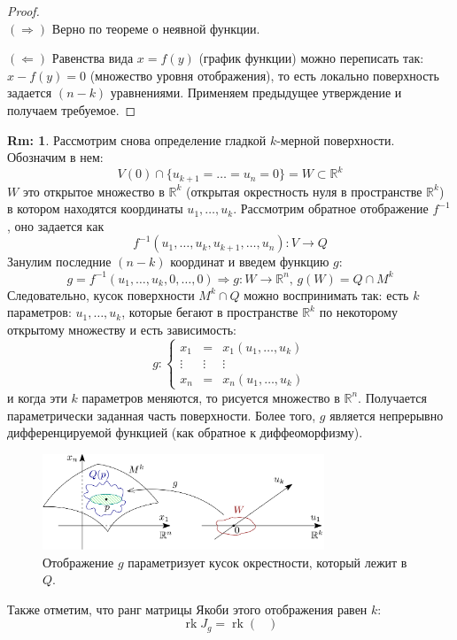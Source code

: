 \documentclass[12pt]{article}
\newcommand{\MR}{\mathbb{R}}
\theoremstyle{definition}
\newtheorem{rem}{Rm:}
\DeclareMathOperator{\rk}{\text{rk}}
\begin{document}
\begin{proof}\hfill\\
	$(\Rightarrow)$  Верно по теореме о неявной функции.
	
	$(\Leftarrow)$ Равенства вида $x = f(y)$ (график функции) можно переписать так: $x -f(y) = 0$ (множество уровня отображения), то есть локально поверхность задается $(n-k)$ уравнениями. Применяем предыдущее утверждение и получаем требуемое.
\end{proof}
\begin{rem}
	Рассмотрим снова определение гладкой $k$-мерной поверхности. Обозначим в нем:
	$$
		V(0) \cap \{u_{k+1} = \dotsc = u_n = 0\} = W \subset \MR^k
	$$
	$W$ это открытое множество в $\MR^k$ (открытая окрестность нуля в пространстве $\MR^k$) в котором находятся координаты $u_1, \dotsc, u_k$. Рассмотрим обратное отображение $f^{-1}$, оно задается как 
	$$
		f^{-1}(u_1,\dotsc,u_k, u_{k+1}, \dotsc, u_n) \colon V \to Q
	$$ 
	Занулим последние $(n-k)$ координат и введем функцию $g$:
	$$
		g = f^{-1}(u_1,\dotsc,u_k, 0, \dotsc, 0) \Rightarrow g\colon W \to \MR^n, \, g(W) = Q \cap M^k
	$$
	Следовательно, кусок поверхности $M^k \cap Q$ можно воспринимать так: есть $k$ параметров: $u_1,\dotsc, u_k$, которые бегают в пространстве $\MR^k$ по некоторому открытому множеству и есть зависимость:
	$$
		g\colon \left\{
		\begin{array}{ccc}
			x_1& = &x_1(u_1,\dotsc, u_k) \\
			\vdots & \vdots & \vdots \\
			x_n& = &x_n(u_1,\dotsc, u_k)
		\end{array}\right.
	$$
	и когда эти $k$ параметров меняются, то рисуется множество в $\MR^n$. Получается параметрически заданная часть поверхности. Более того, $g$ является непрерывно дифференцируемой функцией (как обратное к диффеоморфизму).
	\begin{figure}[H]
		\centering
		\includegraphics[width=0.75\textwidth]{19_7.png}
		\caption{Отображение $g$ параметризует кусок окрестности, который лежит в $Q$.}
		\label{19_7}
	\end{figure}
	Также отметим, что ранг матрицы Якоби этого отображения равен $k$: 
	$$
		\rk J_g = \rk \begin{pmatrix}

\end{pmatrix}$$
\end{rem}
\end{document}
